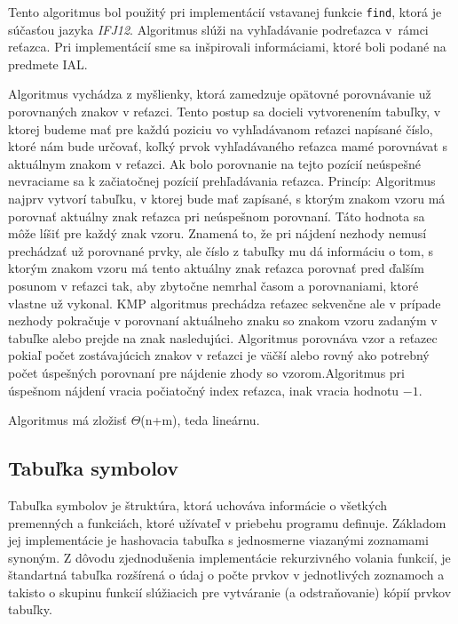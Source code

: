 \documentclass[12pt,a4paper,titlepage,final]{article}
\begin{document}
Tento algoritmus bol použitý pri implementácií vstavanej funkcie \texttt{find}, ktorá je súčasťou jazyka \emph{IFJ12}.
Algoritmus slúži na vyhľadávanie podreťazca v~rámci reťazca. Pri implementácií sme sa inšpirovali informáciami, ktoré boli podané na predmete IAL\cite{Honzik:Algoritmy}.

 Algoritmus vychádza z myšlienky, ktorá zamedzuje opätovné porovnávanie už porovnaných znakov v reťazci. Tento postup sa docieli vytvorenením tabuľky, v ktorej budeme mať pre každú poziciu vo vyhľadávanom reťazci napísané číslo, ktoré nám bude určovať, koľký prvok vyhľadávaného reťazca mamé porovnávat s aktuálnym znakom v reťazci. Ak  bolo porovnanie na tejto pozícií neúspešné nevraciame sa k začiatočnej pozícií prehľadávania reťazca\cite{Prokop:Algoritmy}. Princíp: Algoritmus najprv vytvorí tabuľku, v ktorej bude mať zapísané, s ktorým znakom vzoru má porovnať aktuálny znak reťazca pri neúspešnom porovnaní. Táto hodnota sa môže líšiť pre každý znak vzoru. Znamená to, že pri nájdení nezhody nemusí prechádzať už porovnané prvky, ale číslo z tabuľky mu dá informáciu o tom, s ktorým znakom vzoru má tento aktuálny znak reťazca porovnať pred ďalším posunom v reťazci tak, aby zbytočne nemrhal časom a porovnaniami, ktoré vlastne už vykonal. KMP algoritmus prechádza reťazec sekvenčne ale v prípade nezhody pokračuje v porovnaní aktuálneho znaku so znakom vzoru zadaným v tabuľke alebo prejde na znak nasledujúci. Algoritmus porovnáva vzor a reťazec pokiaľ počet zostávajúcich znakov v reťazci je väčší alebo rovný ako potrebný počet úspešných porovnaní pre nájdenie zhody so vzorom.Algoritmus pri úspešnom nájdení vracia počiatočný index reťazca, inak vracia hodnotu $-1$.  

Algoritmus má zložisť $\Theta$(n+m), teda lineárnu.


\subsection{Tabuľka symbolov}
Tabuľka symbolov je štruktúra, ktorá uchováva informácie o všetkých premenných a funkciách, ktoré užívateľ v priebehu programu definuje. Základom jej implementácie je hashovacia tabuľka s jednosmerne viazanými zoznamami synoným. Z dôvodu zjednodušenia implementácie rekurzivného volania funkcií, je štandartná tabuľka rozšírená o údaj o počte prvkov v jednotlivých zoznamoch a takisto o skupinu funkcií slúžiacich pre vytváranie (a odstraňovanie) kópií prvkov tabuľky. 
\end{document}
